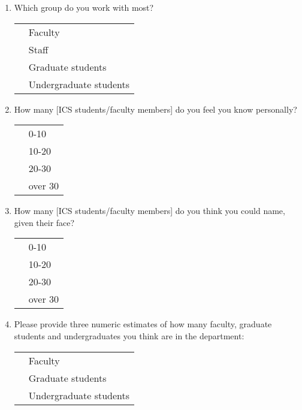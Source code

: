 \begin{enumerate}
\item{Which group do you work with most?}\\
  \begin{tabular}{ll}
    \underline{  }\underline{  }\underline{  }  & Faculty \\
    \underline{  }\underline{  }\underline{  }  & Staff \\
    \underline{  }\underline{  }\underline{  }  & Graduate students \\
    \underline{  }\underline{  }\underline{  }  & Undergraduate students \\
  \end{tabular}

\item{How many [ICS students/faculty members] do you feel you know
  personally?}\\
  \begin{tabular}{ll}
    \underline{  }\underline{  }\underline{  }  & 0-10 \\
    \underline{  }\underline{  }\underline{  }  & 10-20 \\
    \underline{  }\underline{  }\underline{  }  & 20-30 \\
    \underline{  }\underline{  }\underline{  }  & over 30 \\
  \end{tabular}

\item{How many [ICS students/faculty members] do you think you could name,
  given their face?}\\
  \begin{tabular}{ll}
    \underline{  }\underline{  }\underline{  }  & 0-10 \\
    \underline{  }\underline{  }\underline{  }  & 10-20 \\
    \underline{  }\underline{  }\underline{  }  & 20-30 \\
    \underline{  }\underline{  }\underline{  }  & over 30 \\
  \end{tabular}

\item{Please provide three numeric estimates of how many faculty, graduate
  students and  undergraduates you think are in the department:}\\
  \begin{tabular}{ll}
    \underline{  }\underline{  }\underline{  }  & Faculty \\
    \underline{  }\underline{  }\underline{  }  & Graduate students \\
    \underline{  }\underline{  }\underline{  }  & Undergraduate students \\
  \end{tabular}


\end{enumerate}
